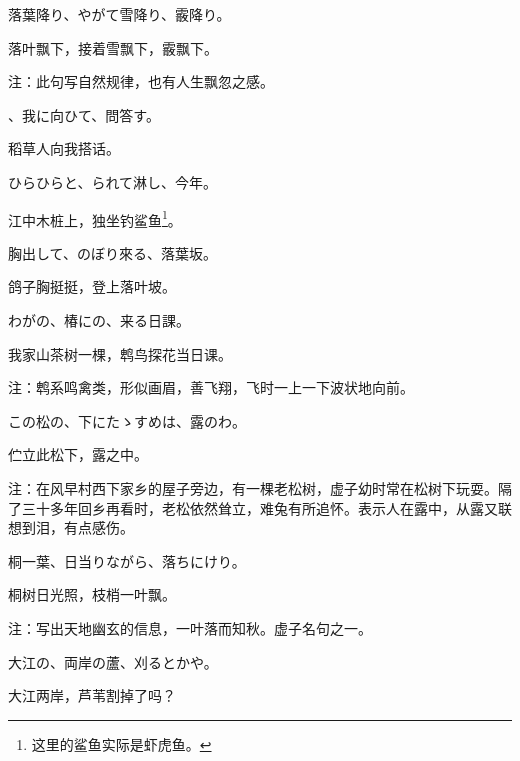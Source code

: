 \begin{haiku}
    {\FH 落葉降り、やがて雪降り、霰降り。}

    {\FK 落叶飘下，接着雪飘下，霰飘下。}

    {\FT 注：此句写自然规律，也有人生飘忽之感。}
\end{haiku}

\begin{haiku}
    {\FH {}、我に向ひて、問答す。}

    {\FK 稻草人向我搭话。}
\end{haiku}

\begin{haiku}
    {\FH ひらひらと、られて淋し、今年。}

    {\FK 江中木桩上，独坐钓鲨鱼\footnote{\FT 这里的鲨鱼实际是虾虎鱼。}。}
\end{haiku}

\begin{haiku}
    {\FH 胸出して、のぼり來る、落葉坂。}

    {\FK 鸽子胸挺挺，登上落叶坡。}
\end{haiku}

\begin{haiku}
    {\FH わがの、椿にの、来る日課。}

    {\FK 我家山茶树一棵，鹎鸟探花当日课。}

    {\FT 注：鹎系鸣禽类，形似画眉，善飞翔，飞时一上一下波状地向前。}
\end{haiku}

\begin{haiku}
    {\FH この松の、下にたゝすめは、露のわ。}

    {\FK 伫立此松下，露之中。}

    {\FT 注：在风早村西下家乡的屋子旁边，有一棵老松树，虚子幼时常在松树下玩耍。隔了三十多年回乡再看时，老松依然耸立，难兔有所追怀。表示人在露中，从露又联想到泪，有点感伤。}
\end{haiku}

\begin{haiku}
    {\FH 桐一葉、日当りながら、落ちにけり。}

    {\FK 桐树日光照，枝梢一叶飘。}

    {\FT 注：写出天地幽玄的信息，一叶落而知秋。虚子名句之一。}
\end{haiku}

\begin{haiku}
    {\FH 大江の、両岸の蘆、刈るとかや。}

    {\FK 大江两岸，芦苇割掉了吗？}
\end{haiku}

